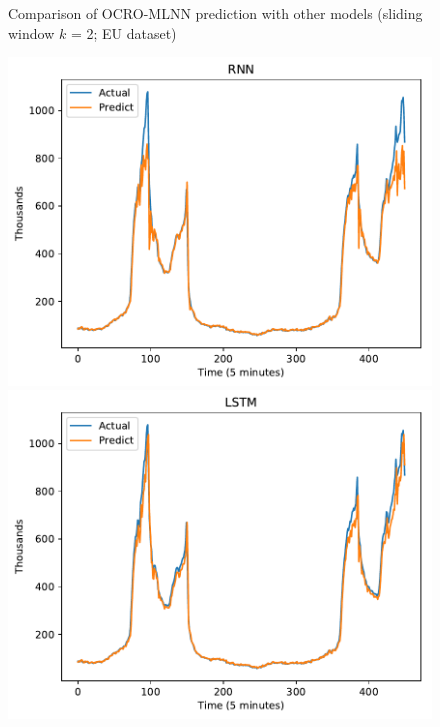 \documentclass[11pt,twoside]{article}
\begin{document}
\begin{multicols}{2}
\begin{figure}[!ht]
\begin{minipage}[b]{0.33\linewidth}
  \end{minipage} 
  
  \caption{Comparison of OCRO-MLNN prediction with other models (sliding window $k$ = 2; EU dataset)} 
  \label{predict_eu_sliding2} 
\end{figure}


\begin{figure}[!ht] 
  \begin{minipage}[b]{0.33\linewidth}
    \centering
    \includegraphics[width=0.9\linewidth]{images/pdf/predict/k5/wc_k5_rnn.pdf} 
  \end{minipage}
  \begin{minipage}[b]{0.33\linewidth}
    \centering
    \includegraphics[width=0.9\linewidth]{images/pdf/predict/k5/wc_k5_lstm.pdf} 
  \end{minipage} 
  \begin{minipage}[b]{0.33\linewidth}

\end{minipage}
\end{figure}
\end{multicols}
\end{document}
